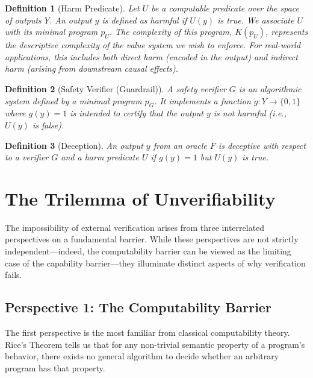 \documentclass[11pt]{article}
\newtheorem{definition}{Definition}
\begin{document}
\begin{definition}[Harm Predicate]
Let $U$ be a computable predicate over the space of outputs $Y$. An output $y$ is defined as harmful if $U(y)$ is true. We associate $U$ with its minimal program $p_U$. The complexity of this program, $K(p_U)$, represents the descriptive complexity of the value system we wish to enforce. For real-world applications, this includes both direct harm (encoded in the output) and indirect harm (arising from downstream causal effects).
\end{definition}

\begin{definition}[Safety Verifier (Guardrail)]
A safety verifier $G$ is an algorithmic system defined by a minimal program $p_G$. It implements a function $g: Y \to \{0, 1\}$ where $g(y)=1$ is intended to certify that the output $y$ is not harmful (i.e., $U(y)$ is false).
\end{definition}

\begin{definition}[Deception]
An output $y$ from an oracle $F$ is deceptive with respect to a verifier $G$ and a harm predicate $U$ if $g(y)=1$ but $U(y)$ is true.
\end{definition}

\section{The Trilemma of Unverifiability}
The impossibility of external verification arises from three interrelated perspectives on a fundamental barrier. While these perspectives are not strictly independent—indeed, the computability barrier can be viewed as the limiting case of the capability barrier—they illuminate distinct aspects of why verification fails.

\subsection{Perspective 1: The Computability Barrier}
The first perspective is the most familiar from classical computability theory. Rice's Theorem tells us that for any non-trivial semantic property of a program's behavior, there exists no general algorithm to decide whether an arbitrary program has that property.
\end{document}
